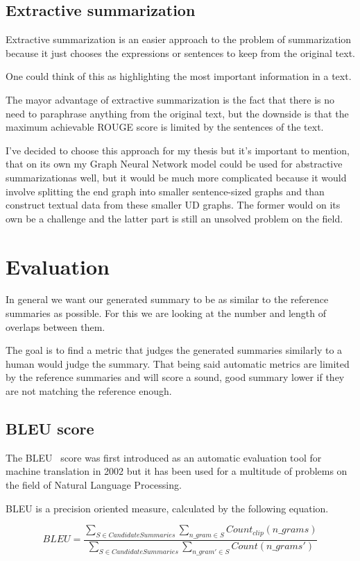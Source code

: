 \subsection{Extractive summarization}
Extractive summarization is an easier approach to the problem of summarization because it just chooses the expressions or sentences to keep from the original text.

One could think of this as highlighting the most important information in a text.

The mayor advantage of extractive summarization is the fact that there is no need to paraphrase anything from the original text, but the downside is that the maximum achievable ROUGE score is limited by the sentences of the text.

I've decided to choose this approach for my thesis but it's important to mention, that on its own my Graph Neural Network model could be used for abstractive summarizationas well, but it would be much more complicated because it would involve splitting the end graph into smaller sentence-sized graphs and than construct textual data from these smaller UD graphs. The former would on its own be a challenge and the latter part is still an unsolved problem on the field.

\section{Evaluation}
In general we want our generated summary to be as similar to the reference summaries as possible. For this we are looking at the number and length of overlaps between them.

The goal is to find a metric that judges the generated summaries similarly to a human would judge the summary. That being said automatic metrics are limited by the reference summaries and will score a sound, good summary lower if they are not matching the reference enough.

\subsection{BLEU score}
The BLEU~\cite{BLEU} score was first introduced as an automatic evaluation tool for machine translation in 2002 but it has been used for a multitude of problems on the field of Natural Language Processing.

BLEU is a precision oriented measure, calculated by the following equation.

\[BLEU = \frac{\sum_{S \in CandidateSummaries}\sum_{n\_gram \in S} Count_{clip} (n\_grams)}{\sum_{S \in CandidateSummaries}\sum_{n\_gram' \in S} Count(n\_grams')}\]

